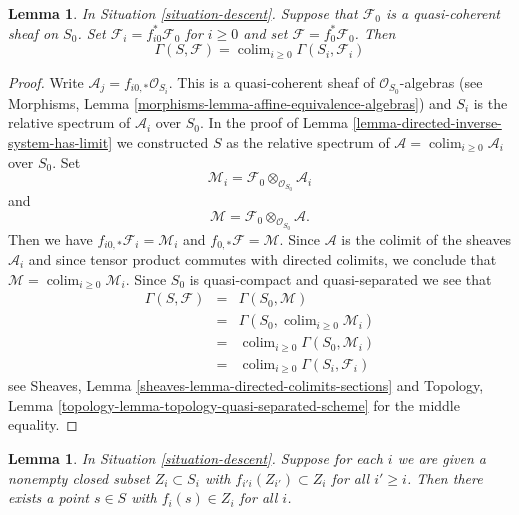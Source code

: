 \documentclass{stacks-project}
\theoremstyle{plain}
\newtheorem{lemma}[subsection]{Lemma}
\theoremstyle{definition}
\theoremstyle{remark}
\numberwithin{equation}{subsection}
\def\colim{\mathop{\mathrm{colim}}\nolimits}
\begin{document}
\begin{lemma}
\label{lemma-descend-section}
In Situation \ref{situation-descent}.
Suppose that $\mathcal{F}_0$ is a quasi-coherent sheaf on $S_0$.
Set $\mathcal{F}_i = f_{i0}^*\mathcal{F}_0$ for $i \geq 0$ and set
$\mathcal{F} = f_0^*\mathcal{F}_0$.
Then
$$
\Gamma(S, \mathcal{F}) = \colim_{i \geq 0} \Gamma(S_i, \mathcal{F}_i)
$$
\end{lemma}

\begin{proof}
Write $\mathcal{A}_j = f_{i0, *} \mathcal{O}_{S_i}$.
This is a quasi-coherent sheaf of $\mathcal{O}_{S_0}$-algebras
(see Morphisms, Lemma \ref{morphisms-lemma-affine-equivalence-algebras})
and $S_i$ is the relative spectrum of $\mathcal{A}_i$ over $S_0$.
In the proof of Lemma \ref{lemma-directed-inverse-system-has-limit}
we constructed $S$ as the relative spectrum of
$\mathcal{A} = \colim_{i \geq 0} \mathcal{A}_i$
over $S_0$. Set
$$
\mathcal{M}_i = \mathcal{F}_0 \otimes_{\mathcal{O}_{S_0}} \mathcal{A}_i
$$
and
$$
\mathcal{M} = \mathcal{F}_0 \otimes_{\mathcal{O}_{S_0}} \mathcal{A}.
$$
Then we have $f_{i0, *} \mathcal{F}_i = \mathcal{M}_i$
and $f_{0, *}\mathcal{F} = \mathcal{M}$. Since $\mathcal{A}$
is the colimit of the sheaves $\mathcal{A}_i$ and since tensor
product commutes with directed colimits, we conclude that
$\mathcal{M} = \colim_{i \geq 0} \mathcal{M}_i$.
Since $S_0$ is quasi-compact and quasi-separated we see that
\begin{eqnarray*}
\Gamma(S, \mathcal{F})
& = &
\Gamma(S_0, \mathcal{M}) \\
& = &
\Gamma(S_0, \colim_{i \geq 0} \mathcal{M}_i) \\
& = &
\colim_{i \geq 0} \Gamma(S_0, \mathcal{M}_i) \\
& = &
\colim_{i \geq 0} \Gamma(S_i, \mathcal{F}_i)
\end{eqnarray*}
see Sheaves, Lemma \ref{sheaves-lemma-directed-colimits-sections} and
Topology, Lemma \ref{topology-lemma-topology-quasi-separated-scheme}
for the middle equality.
\end{proof}

\begin{lemma}
\label{lemma-limit-closed-nonempty}
In Situation \ref{situation-descent}.
Suppose for each $i$ we are given a nonempty closed subset
$Z_i \subset S_i$ with $f_{i'i}(Z_{i'}) \subset Z_i$ for all
$i' \geq i$.
Then there exists a point $s \in S$ with $f_i(s) \in Z_i$ for
all $i$.
\end{lemma}
\end{document}
